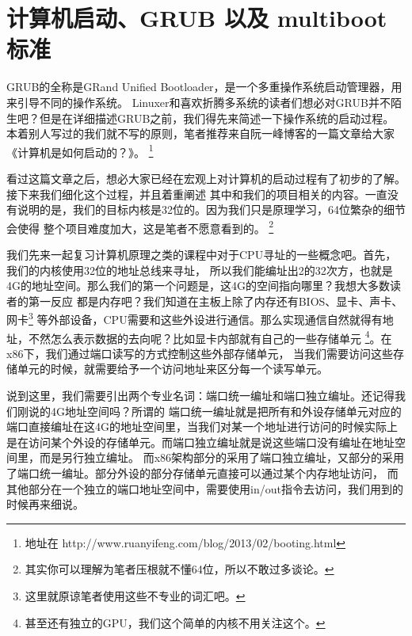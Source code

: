
\section {计算机启动、GRUB 以及 multiboot 标准}

\par GRUB的全称是GRand Unified Bootloader，是一个多重操作系统启动管理器，用来引导不同的操作系统。\allowbreak
Linuxer和喜欢折腾多系统的读者们想必对GRUB并不陌生吧？但是在详细描述GRUB之前，我们得先来简述一下操作系统的启动过程。\allowbreak
本着别人写过的我们就不写的原则，笔者推荐来自阮一峰博客的一篇文章给大家《计算机是如何启动的？》。
\footnote{地址在 http://www.ruanyifeng.com/blog/2013/02/booting.html}

\par 看过这篇文章之后，想必大家已经在宏观上对计算机的启动过程有了初步的了解。接下来我们细化这个过程，并且着重阐述\allowbreak
其中和我们的项目相关的内容。一直没有说明的是，我们的目标内核是32位的。因为我们只是原理学习，64位繁杂的细节会使得\allowbreak
整个项目难度加大，这是笔者不愿意看到的。
\footnote{其实你可以理解为笔者压根就不懂64位，所以不敢过多谈论。}

\par 我们先来一起复习计算机原理之类的课程中对于CPU寻址的一些概念吧。首先，我们的内核使用32位的地址总线来寻址，\allowbreak
所以我们能编址出2的32次方，也就是4G的地址空间。那么我们的第一个问题是，这4G的空间指向哪里？我想大多数读者的第一反应\allowbreak
都是内存吧？我们知道在主板上除了内存还有BIOS、显卡、声卡、网卡\footnote{这里就原谅笔者使用这些不专业的词汇吧。}\allowbreak
等外部设备，CPU需要和这些外设进行通信。那么实现通信自然就得有地址，不然怎么表示数据的去向呢？比如显卡内部就有自己的一些存储单元\allowbreak
\footnote{甚至还有独立的GPU，我们这个简单的内核不用关注这个。}。在x86下，我们通过端口读写的方式控制这些外部存储单元，\allowbreak
当我们需要访问这些存储单元的时候，就需要给予一个访问地址来区分每一个读写单元。

\par 说到这里，我们需要引出两个专业名词：端口统一编址和端口独立编址。还记得我们刚说的4G地址空间吗？所谓的\allowbreak
端口统一编址就是把所有和外设存储单元对应的端口直接编址在这4G的地址空间里，当我们对某一个地址进行访问的时候实际上\allowbreak
是在访问某个外设的存储单元。而端口独立编址就是说这些端口没有编址在地址空间里，而是另行独立编址。\allowbreak
而x86架构部分的采用了端口独立编址，又部分的采用了端口统一编址。部分外设的部分存储单元直接可以通过某个内存地址访问，\allowbreak
而其他部分在一个独立的端口地址空间中，需要使用in/out指令去访问，我们用到的时候再来细说。

